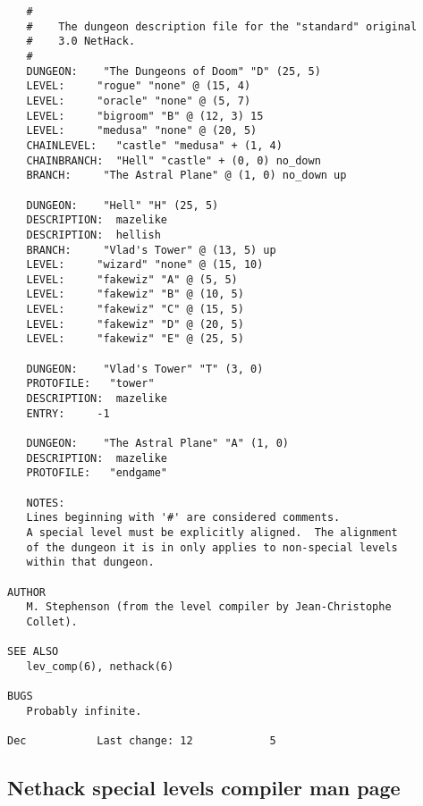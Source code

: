\documentclass[11pt]{article}
\begin{document}
\begin{verbatim}
   #
   #    The dungeon description file for the "standard" original
   #    3.0 NetHack.
   #
   DUNGEON:    "The Dungeons of Doom" "D" (25, 5)
   LEVEL:     "rogue" "none" @ (15, 4)
   LEVEL:     "oracle" "none" @ (5, 7)
   LEVEL:     "bigroom" "B" @ (12, 3) 15
   LEVEL:     "medusa" "none" @ (20, 5)
   CHAINLEVEL:   "castle" "medusa" + (1, 4)
   CHAINBRANCH:  "Hell" "castle" + (0, 0) no_down
   BRANCH:     "The Astral Plane" @ (1, 0) no_down up

   DUNGEON:    "Hell" "H" (25, 5)
   DESCRIPTION:  mazelike
   DESCRIPTION:  hellish
   BRANCH:     "Vlad's Tower" @ (13, 5) up
   LEVEL:     "wizard" "none" @ (15, 10)
   LEVEL:     "fakewiz" "A" @ (5, 5)
   LEVEL:     "fakewiz" "B" @ (10, 5)
   LEVEL:     "fakewiz" "C" @ (15, 5)
   LEVEL:     "fakewiz" "D" @ (20, 5)
   LEVEL:     "fakewiz" "E" @ (25, 5)

   DUNGEON:    "Vlad's Tower" "T" (3, 0)
   PROTOFILE:   "tower"
   DESCRIPTION:  mazelike
   ENTRY:     -1

   DUNGEON:    "The Astral Plane" "A" (1, 0)
   DESCRIPTION:  mazelike
   PROTOFILE:   "endgame"

   NOTES:
   Lines beginning with '#' are considered comments.
   A special level must be explicitly aligned.  The alignment
   of the dungeon it is in only applies to non-special levels
   within that dungeon.

AUTHOR
   M. Stephenson (from the level compiler by Jean-Christophe
   Collet).

SEE ALSO
   lev_comp(6), nethack(6)

BUGS
   Probably infinite.

Dec           Last change: 12            5

\end{verbatim}

\subsection{Nethack special levels compiler man page}
\label{sec:org095b03c}
\end{document}
